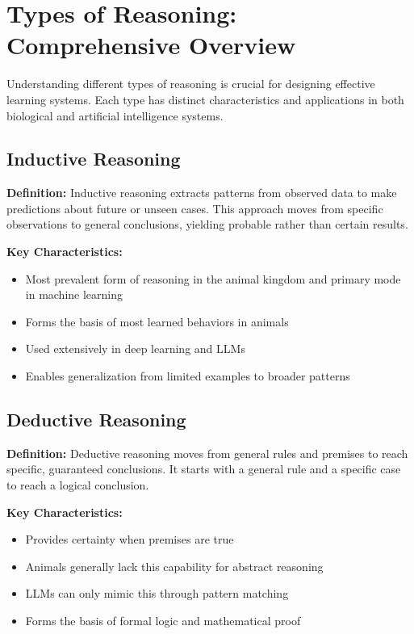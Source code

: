 \section{Types of Reasoning: Comprehensive Overview}
Understanding different types of reasoning is crucial for designing effective learning systems. Each type has distinct characteristics and applications in both biological and artificial intelligence systems.

\subsection{Inductive Reasoning}
\textbf{Definition:} Inductive reasoning extracts patterns from observed data to make predictions about future or unseen cases. This approach moves from specific observations to general conclusions, yielding probable rather than certain results.

\textbf{Key Characteristics:}
\begin{itemize}
    \item Most prevalent form of reasoning in the animal kingdom and primary mode in machine learning
    \item Forms the basis of most learned behaviors in animals
    \item Used extensively in deep learning and LLMs
    \item Enables generalization from limited examples to broader patterns
\end{itemize}

\subsection{Deductive Reasoning}
\textbf{Definition:} Deductive reasoning moves from general rules and premises to reach specific, guaranteed conclusions. It starts with a general rule and a specific case to reach a logical conclusion.

\textbf{Key Characteristics:}
\begin{itemize}
    \item Provides certainty when premises are true
    \item Animals generally lack this capability for abstract reasoning
    \item LLMs can only mimic this through pattern matching
    \item Forms the basis of formal logic and mathematical proof
\end{itemize}

